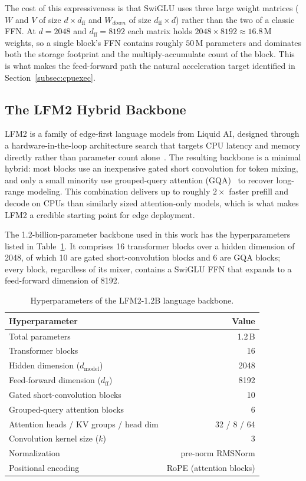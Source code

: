 The cost of this expressiveness is that SwiGLU uses three large weight matrices ($W$ and
$V$ of size $d \times d_{\text{ff}}$ and $W_{down}$ of size $d_{\text{ff}} \times d$)
rather than the two of a classic FFN. At $d = 2048$ and $d_{\text{ff}} = 8192$ each
matrix holds $2048 \times 8192 \approx 16.8$\,M weights, so a single block's FFN
contains roughly $50$\,M parameters and dominates both the storage footprint and the
multiply-accumulate count of the block. This is what makes the feed-forward path the
natural acceleration target identified in Section~\ref{subsec:cpuexec}.

\subsection{The LFM2 Hybrid Backbone}
\label{subsec:lfm2_bg}
LFM2 is a family of edge-first language models from Liquid AI, designed through a
hardware-in-the-loop architecture search that targets CPU latency and memory directly
rather than parameter count alone~\cite{amini2025lfm2technicalreport}. The resulting
backbone is a minimal hybrid: most blocks use an inexpensive gated short convolution
for token mixing, and only a small minority use grouped-query attention
(GQA)~\cite{ainslie2023gqa} to recover long-range modeling. This combination delivers up to roughly $2\times$ faster
prefill and decode on CPUs than similarly sized attention-only models, which is what
makes LFM2 a credible starting point for edge deployment.

The 1.2-billion-parameter backbone used in this work has the hyperparameters listed in
Table~\ref{tab:lfm2_dims}. It comprises 16 transformer blocks over a hidden dimension
of 2048, of which 10 are gated short-convolution blocks and 6 are GQA blocks; every
block, regardless of its mixer, contains a SwiGLU FFN that expands to a feed-forward
dimension of 8192.

\begin{table}[htbp]
\centering
\caption{Hyperparameters of the LFM2-1.2B language backbone.}
\label{tab:lfm2_dims}
\begin{tabular}{lr}
\hline
\textbf{Hyperparameter} & \textbf{Value} \\ \hline
Total parameters & 1.2\,B \\
Transformer blocks & 16 \\
Hidden dimension ($d_{\text{model}}$) & 2048 \\
Feed-forward dimension ($d_{\text{ff}}$) & 8192 \\
Gated short-convolution blocks & 10 \\
Grouped-query attention blocks & 6 \\
Attention heads / KV groups / head dim & 32 / 8 / 64 \\
Convolution kernel size ($k$) & 3 \\
Normalization & pre-norm RMSNorm \\
Positional encoding & RoPE (attention blocks) \\ \hline
\end{tabular}
\end{table}

